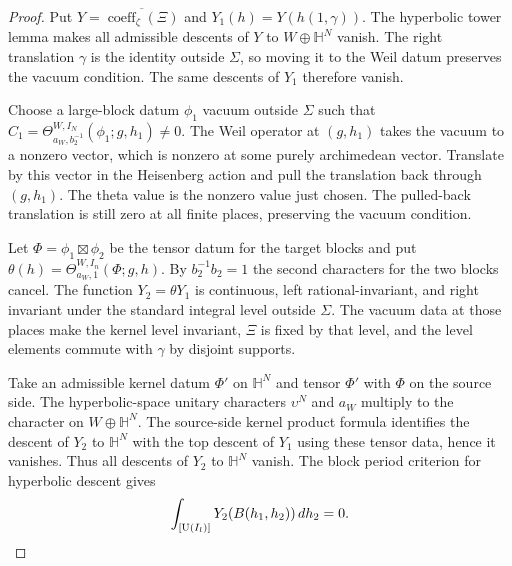 \begin{proof}
Put $Y=\overline{\operatorname{coeff}_\zeta(\Xi)}$ and $Y_1(h)=Y(h(1,\gamma))$. The hyperbolic tower lemma makes all admissible descents of $Y$ to $W\oplus\mathbb H^N$ vanish. The right translation $\gamma$ is the identity outside $\Sigma$, so moving it to the Weil datum preserves the vacuum condition. The same descents of $Y_1$ therefore vanish.

Choose a large-block datum $\phi_1$ vacuum outside $\Sigma$ such that $C_1=\Theta^{W,I_N}_{a_W,b_2^{-1}}(\phi_1;g,h_1)\ne0$. The Weil operator at $(g,h_1)$ takes the vacuum to a nonzero vector, which is nonzero at some purely archimedean vector. Translate by this vector in the Heisenberg action and pull the translation back through $(g,h_1)$. The theta value is the nonzero value just chosen. The pulled-back translation is still zero at all finite places, preserving the vacuum condition.

Let $\Phi=\phi_1\boxtimes\phi_2$ be the tensor datum for the target blocks and put $\theta(h)=\Theta^{W,I_n}_{a_W,1}(\Phi;g,h)$. By $b_2^{-1}b_2=1$ the second characters for the two blocks cancel. The function $Y_2=\theta Y_1$ is continuous, left rational-invariant, and right invariant under the standard integral level outside $\Sigma$. The vacuum data at those places make the kernel level invariant, $\Xi$ is fixed by that level, and the level elements commute with $\gamma$ by disjoint supports.

Take an admissible kernel datum $\Phi'$ on $\mathbb H^N$ and tensor $\Phi'$ with $\Phi$ on the source side. The hyperbolic-space unitary characters $\upsilon^N$ and $a_W$ multiply to the character on $W\oplus\mathbb H^N$. The source-side kernel product formula identifies the descent of $Y_2$ to $\mathbb H^N$ with the top descent of $Y_1$ using these tensor data, hence it vanishes. Thus all descents of $Y_2$ to $\mathbb H^N$ vanish. The block period criterion for hyperbolic descent gives
\[
 \int_{[\operatorname{U}(I_l)]}Y_2(B(h_1,h_2))\,dh_2=0 .
\]


\end{proof}
